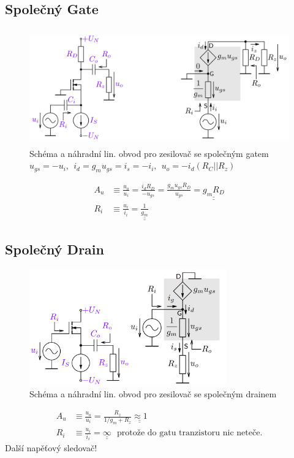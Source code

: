 \documentclass[a4paper,12pt]{article}   %
\begin{document}
\subsection*{Společný Gate}
\begin{figure}[h!]
    \centering
    \includegraphics[height=5cm]{NMOS-SG.PNG}
    \caption{Schéma a náhradní lin. obvod pro zesilovač se společným gatem\\\centering$u_{gs} = -u_i,~~i_d=g_mu_{gs}=i_s = -i_i,~~ u_o=-i_d(R_C||R_z)$}
    \label{fig:zes:sg}
\end{figure}
\begin{align}
    A_u &\equiv \frac{u_o}{u_i} = \frac{i_dR_D}{-u_{gs}} = \frac{g_m u_{gs}R_D}{u_{gs}} = \underline{\underline{g_mR_D}}\\
    R_i &\equiv \frac{u_i}{i_i} = \underline{\underline{\frac{1}{g_m}}}
\end{align}

\subsection*{Společný Drain}
\begin{figure}[h!]
    \centering
    \includegraphics[height=5cm]{NMOS-SD.PNG}
    \caption{Schéma a náhradní lin. obvod pro zesilovač se společným drainem}
    \label{fig:zes:sd}
\end{figure}
\begin{align}
    A_u &\equiv \frac{u_o}{u_i} = \frac{R_z}{1/g_m + R_z} \underline{\underline{\approx 1}}\\
    R_i &\equiv \frac{u_i}{i_i} = \underline{\underline{\infty}}\text{~~protože do gatu tranzistoru nic neteče.}
\end{align}
Další napěťový sledovač!
\end{document}
